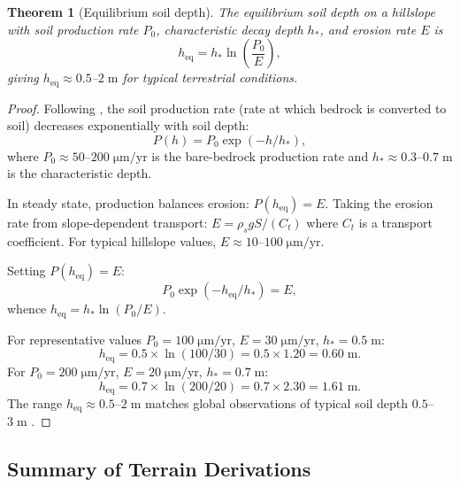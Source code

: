 \documentclass[10pt,twocolumn]{article}
\newtheorem{theorem}{Theorem}[section]
\theoremstyle{definition}
\theoremstyle{remark}
\begin{document}
\begin{theorem}[Equilibrium soil depth]\label{thm:soil}
The equilibrium soil depth on a hillslope with soil production
rate $P_0$, characteristic decay depth $h_*$, and erosion rate
$E$ is
\begin{equation}\label{eq:soil}
  h_{\mathrm{eq}} = h_*\ln\!\left(\frac{P_0}{E}\right),
\end{equation}
giving $h_{\mathrm{eq}}\approx 0.5$--$2\;\mathrm{m}$ for
typical terrestrial conditions.
\end{theorem}

\begin{proof}
Following \citet{Heimsath1997}, the soil production rate
(rate at which bedrock is converted to soil) decreases
exponentially with soil depth:
\begin{equation}\label{eq:prod}
  P(h) = P_0\exp(-h/h_*),
\end{equation}
where $P_0\approx 50$--$200\;\mathrm{\mu m/yr}$ is the bare-bedrock
production rate and $h_*\approx 0.3$--$0.7\;\mathrm{m}$ is the
characteristic depth.

In steady state, production balances erosion: $P(h_{\mathrm{eq}})=E$.
Taking the erosion rate from slope-dependent transport:
$E = \rho_s g S/(C_t)$ where $C_t$ is a transport coefficient.
For typical hillslope values, $E\approx 10$--$100\;\mathrm{\mu m/yr}$.

Setting $P(h_{\mathrm{eq}})=E$:
\begin{equation}
  P_0\exp(-h_{\mathrm{eq}}/h_*) = E,
\end{equation}
whence $h_{\mathrm{eq}} = h_*\ln(P_0/E)$.

For representative values $P_0=100\;\mathrm{\mu m/yr}$,
$E=30\;\mathrm{\mu m/yr}$, $h_*=0.5\;\mathrm{m}$:
\begin{equation}
  h_{\mathrm{eq}} = 0.5\times\ln(100/30)
  = 0.5\times 1.20 = 0.60\;\mathrm{m}.
\end{equation}
For $P_0=200\;\mathrm{\mu m/yr}$, $E=20\;\mathrm{\mu m/yr}$,
$h_*=0.7\;\mathrm{m}$:
\begin{equation}
  h_{\mathrm{eq}} = 0.7\times\ln(200/20)
  = 0.7\times 2.30 = 1.61\;\mathrm{m}.
\end{equation}
The range $h_{\mathrm{eq}}\approx 0.5$--$2\;\mathrm{m}$ matches
global observations of typical soil depth $0.5$--$3\;\mathrm{m}$
\citep{Dietrich2003,Heimsath1997}.
\end{proof}

\subsection{Summary of Terrain Derivations}\label{sec:terrain_summary}
\end{document}
